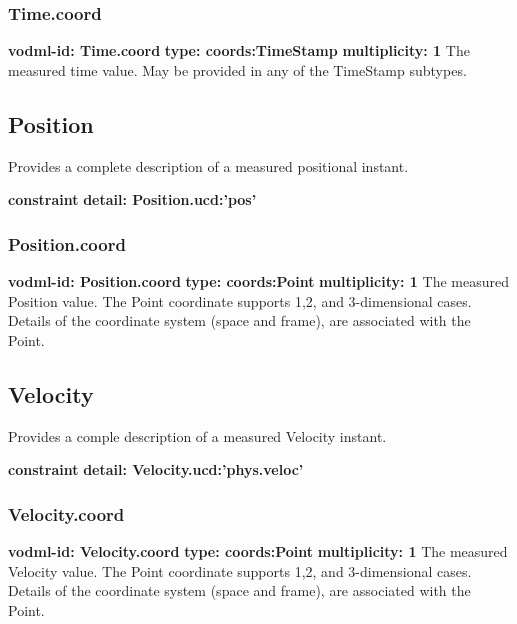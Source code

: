     \subsubsection{Time.coord}
      \textbf{vodml-id: Time.coord} \newline
      \textbf{type: coords:TimeStamp} \newline
      \textbf{multiplicity: 1} \newline 
      The measured time value. May be provided in any of the TimeStamp subtypes.


  \subsection{Position}
  \label{sect:Position}
    Provides a complete description of a measured positional instant.

    \noindent \textbf{constraint} \newline
    \indent    \textbf{detail: Position.ucd:'pos' }\newline

    \subsubsection{Position.coord}
      \textbf{vodml-id: Position.coord} \newline
      \textbf{type: coords:Point} \newline
      \textbf{multiplicity: 1} \newline 
      The measured Position value. The Point coordinate supports 1,2, and 3-dimensional cases. Details of the coordinate system (space and frame), are associated with the Point.


  \subsection{Velocity}
  \label{sect:Velocity}
    Provides a comple description of a measured Velocity instant.

    \noindent \textbf{constraint} \newline
    \indent    \textbf{detail: Velocity.ucd:'phys.veloc' }\newline

    \subsubsection{Velocity.coord}
      \textbf{vodml-id: Velocity.coord} \newline
      \textbf{type: coords:Point} \newline
      \textbf{multiplicity: 1} \newline 
      The measured Velocity value. The Point coordinate supports 1,2, and 3-dimensional cases. Details of the coordinate system (space and frame), are associated with the Point.


